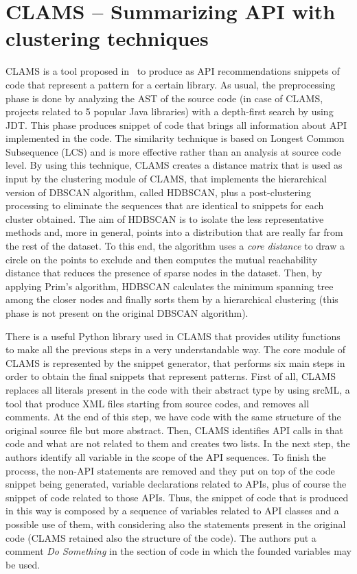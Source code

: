 \section{CLAMS -- Summarizing API with 
clustering techniques}
CLAMS is a tool proposed 
in~\cite{katirtzis_summarizing_2018} to 
produce as API 
recommendations snippets of code that 
represent a pattern for a certain 
library. As usual, the preprocessing phase 
is done by analyzing the AST of the 
source code (in case of CLAMS, projects 
related to 5 popular Java libraries) 
with a depth-first search by using JDT. 
This phase produces snippet of code 
that brings all information about API 
implemented in the code. The similarity 
technique is based on Longest Common 
Subsequence (LCS) and is more effective 
rather than an analysis at source code 
level. By using this technique, CLAMS 
creates a distance matrix that is used as 
input by the clustering module of 
CLAMS, that implements the hierarchical 
version of DBSCAN algorithm, called 
HDBSCAN, plus a post-clustering processing 
to eliminate the sequences that are 
identical to snippets for each cluster 
obtained. The aim of HDBSCAN is to 
isolate the less representative methods 
and, more in general, points into a 
distribution that are really far from the 
rest of the dataset. To this end, the 
algorithm uses a \textit{core distance} to 
draw a circle on the points to 
exclude and then computes the mutual 
reachability distance that reduces the 
presence of sparse nodes in the dataset. 
Then, by applying Prim's algorithm, 
HDBSCAN calculates the minimum spanning 
tree among the closer nodes and finally 
sorts them by a hierarchical clustering 
(this phase is not present on the 
original DBSCAN algorithm). 

There is a useful Python library used in 
CLAMS that provides utility functions 
to make all the previous steps in a very 
understandable way. The core module of 
CLAMS is represented by the snippet 
generator, that performs six main steps in 
order to obtain the final snippets that 
represent patterns. First of all, CLAMS 
replaces all literals present in the code 
with their abstract type by using 
srcML, a tool that produce XML files 
starting from source codes, and removes 
all comments. At the end of this step, we 
have code with the same structure of 
the original source file but more abstract. 
Then, CLAMS identifies API calls in 
that code and what are not related to them 
and creates two lists. In the next 
step, the authors identify all variable in 
the scope of the API sequences. To 
finish the process, the non-API statements 
are removed and they put on top of 
the code snippet being generated, variable 
declarations related to APIs, plus 
of course the snippet of code related to 
those APIs. Thus, the snippet of code 
that is produced in this way is composed by 
a sequence of variables related to 
API classes and a possible use of them, 
with considering also the statements 
present in the original code (CLAMS 
retained also the structure of the code). 
The authors put a comment \textit{Do 
Something} in the section of code in which 
the founded variables may be used. 

